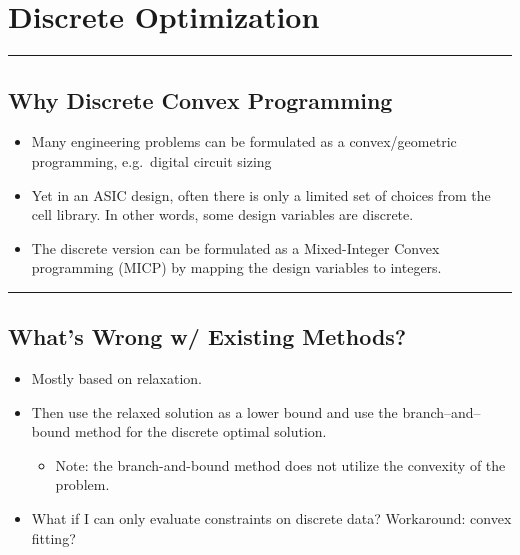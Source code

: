 \documentclass[]{article}
\providecommand{\tightlist}{%
  \setlength{\itemsep}{0pt}\setlength{\parskip}{0pt}}
\begin{document}
\hypertarget{discrete-optimization}{%
\section{Discrete Optimization}\label{discrete-optimization}}

\begin{center}\rule{0.5\linewidth}{\linethickness}\end{center}

\hypertarget{why-discrete-convex-programming}{%
\subsection{Why Discrete Convex
Programming}\label{why-discrete-convex-programming}}

\begin{itemize}
\item
  Many engineering problems can be formulated as a convex/geometric
  programming, e.g.~digital circuit sizing
\item
  Yet in an ASIC design, often there is only a limited set of choices
  from the cell library. In other words, some design variables are
  discrete.
\item
  The discrete version can be formulated as a Mixed-Integer Convex
  programming (MICP) by mapping the design variables to integers.
\end{itemize}

\begin{center}\rule{0.5\linewidth}{\linethickness}\end{center}

\hypertarget{whats-wrong-w-existing-methods}{%
\subsection{What's Wrong w/ Existing
Methods?}\label{whats-wrong-w-existing-methods}}

\begin{itemize}
\item
  Mostly based on relaxation.
\item
  Then use the relaxed solution as a lower bound and use the
  branch--and--bound method for the discrete optimal solution.

  \begin{itemize}
  \tightlist
  \item
    Note: the branch-and-bound method does not utilize the convexity of
    the problem.
  \end{itemize}
\item
  What if I can only evaluate constraints on discrete data? Workaround:
  convex fitting?
\end{itemize}
\end{document}
